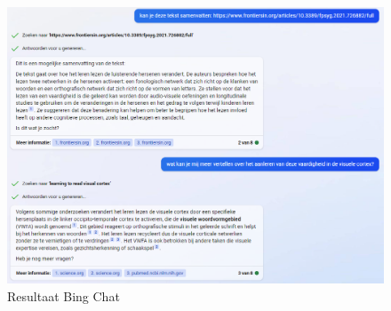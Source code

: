 \begin{figure}[H]
	\includegraphics{img/bing-ai-chatbot-example.png}
	\caption{Resultaat Bing Chat}
	\label{img:tryout-bing-ai}
\end{figure}

\medspace




\medspace

